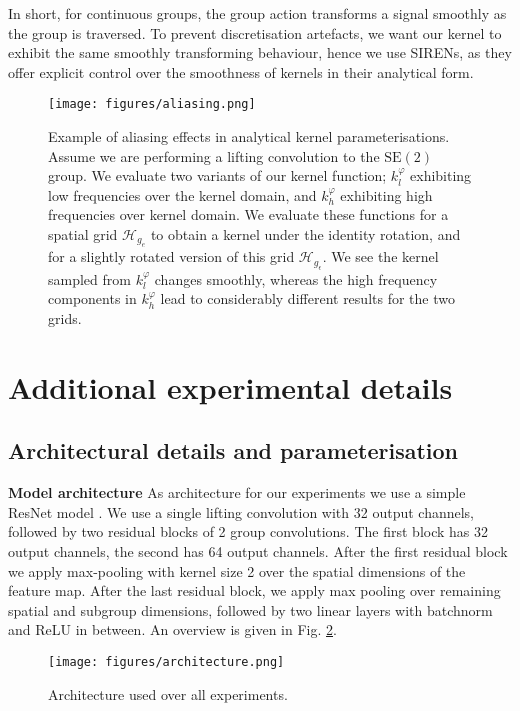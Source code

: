 \documentclass[nohyperref]{article}
\theoremstyle{plain}
\theoremstyle{definition}
\theoremstyle{remark}
\begin{document}
In short, for continuous groups, the group action transforms a signal smoothly as the group is traversed. To prevent discretisation artefacts, we want our kernel to exhibit the same smoothly transforming behaviour, hence we use SIRENs, as they offer explicit control over the smoothness of kernels in their analytical form.
\begin{figure}
\centering
\texttt{[image: figures/aliasing.png]}
\caption[Aliasing effects in analytical kernel functions]{Example of aliasing effects in analytical kernel parameterisations. Assume we are performing a lifting convolution to the $\mathrm{SE(2)}$ group. We evaluate two variants of our kernel function; $k^{\varphi}_l$ exhibiting low frequencies over the kernel domain, and $k^{\varphi}_h$ exhibiting high frequencies over kernel domain. We evaluate these functions for a spatial grid $\mathcal{H}_{g_e}$ to obtain a kernel under the identity rotation, and for a slightly rotated version of this grid $\mathcal{H}_{g_\epsilon}$. We see the kernel sampled from $k^{\varphi}_l$ changes smoothly, whereas the high frequency components in $k_h^{\varphi}$ lead to considerably different results for the two grids.}
\label{fig:aliasing}
\end{figure}

\section{Additional experimental details}

\subsection{Architectural details and parameterisation} \label{app:architectureandparam}
\textbf{Model architecture} \label{app:architecture} As architecture for our experiments we use a simple ResNet model \citep{he2016deep}. We use a single lifting convolution with 32 output channels, followed by two residual blocks of 2 group convolutions. The first block has 32 output channels, the second has 64 output channels. After the first residual block we apply max-pooling with kernel size 2 over the spatial dimensions of the feature map. After the last residual block, we apply max pooling over remaining spatial and subgroup dimensions, followed by two linear layers with batchnorm and ReLU in between. An overview is given in Fig. \ref{fig:architecture}.

\begin{figure}
\centering
  \texttt{[image: figures/architecture.png]}
  \caption{Architecture used over all experiments.}
  \label{fig:architecture}
\end{figure}
\end{document}
